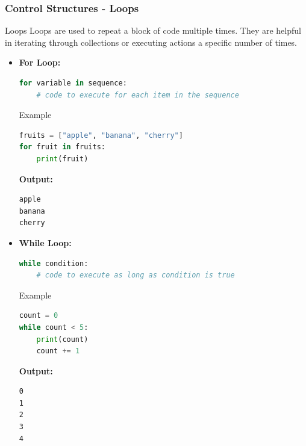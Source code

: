 \documentclass{beamer}
\begin{document}
\begin{frame}
    \frametitle{Control Structures - Loops}
    
    \begin{block}{Loops}
        Loops are used to repeat a block of code multiple times. They are helpful in iterating through collections or executing actions a specific number of times.
    \end{block}
    
    \begin{itemize}
        \item \textbf{For Loop:}
        \begin{lstlisting}[language=Python]
for variable in sequence:
    # code to execute for each item in the sequence
        \end{lstlisting}
        \begin{block}{Example}
            \begin{lstlisting}[language=Python]
fruits = ["apple", "banana", "cherry"]
for fruit in fruits:
    print(fruit)
            \end{lstlisting}
            \textbf{Output:}
            \begin{verbatim}
apple
banana
cherry
            \end{verbatim}
        \end{block}
        
        \item \textbf{While Loop:}
        \begin{lstlisting}[language=Python]
while condition:
    # code to execute as long as condition is true
        \end{lstlisting}
        \begin{block}{Example}
            \begin{lstlisting}[language=Python]
count = 0
while count < 5:
    print(count)
    count += 1
            \end{lstlisting}
            \textbf{Output:}
            \begin{verbatim}
0
1
2
3
4
            \end{verbatim}
        \end{block}
    \end{itemize}
\end{frame}
\end{document}
